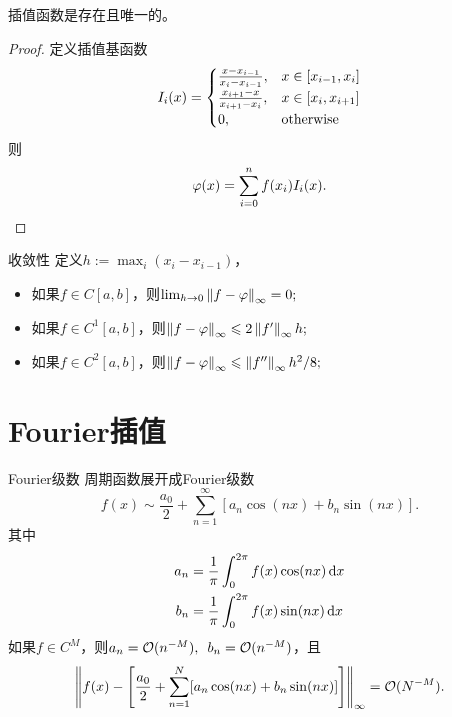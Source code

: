 \begin{theorem}
    {}{}
    插值函数是存在且唯一的。
\end{theorem}

\begin{proof}
    定义插值基函数
    \begin{equation}
        I_i(x)=\begin{cases}
            \frac{x-x_{i-1}}{x_i-x_{i-1}},&x\in[x_{i-1},x_i]\\
            \frac{x_{i+1}-x}{x_{i+1}-x_i},&x\in[x_i,x_{i+1}]\\
            0,&\mathrm{otherwise}
        \end{cases}
    \end{equation}
    则
    \begin{equation}
        \varphi(x)=\sum_{i=0}^nf(x_i)I_i(x).
        \qedhere
    \end{equation}
\end{proof}

\begin{theorem}
    {收敛性}{}
    定义$h:=\max_i(x_i-x_{i-1})$，
    \begin{itemize}
        \item 如果$f\in C[a,b]$，则$\lim_{h\to0}\left\lVert f-\varphi\right\rVert_\infty=0;$
        \item 如果$f\in C^1[a,b]$，则$\left\lVert f-\varphi\right\rVert_\infty\leqslant 2\left\lVert f'\right\rVert_\infty h;$
        \item 如果$f\in C^2[a,b]$，则$\left\lVert f-\varphi\right\rVert_\infty\leqslant \left\lVert f''\right\rVert_\infty h^2/8;$
    \end{itemize}
\end{theorem}

\section{Fourier插值}
\label{sec:Fourier interpolation}

\begin{definition}
    {Fourier级数}{}
    周期函数展开成Fourier级数
    \begin{equation}
        f(x)\sim\frac{a_0}2+\sum_{n=1}^\infty[a_n\cos(nx)+b_n\sin(nx)].
    \end{equation}
    其中
    \begin{subequations}
        \begin{align}
            a_n&=\frac1\pi\int_0^{2\pi}f(x)\cos(nx)\mathop{}\!\mathrm{d} x\\
            b_n&=\frac1\pi\int_0^{2\pi}f(x)\sin(nx)\mathop{}\!\mathrm{d} x
        \end{align}
    \end{subequations}
    \tcblower
    如果$f\in C^M$，则$a_n=\mathcal O(n^{-M}),\enspace b_n=\mathcal O(n^{-M})$，且
    \[
        \left\lVert f(x)-\left[\frac{a_0}2+\sum_{n=1}^N[a_n\cos(nx)+b_n\sin(nx)]\right]\right\rVert_\infty=\mathcal O(N^{-M}).
    \] 
\end{definition}

